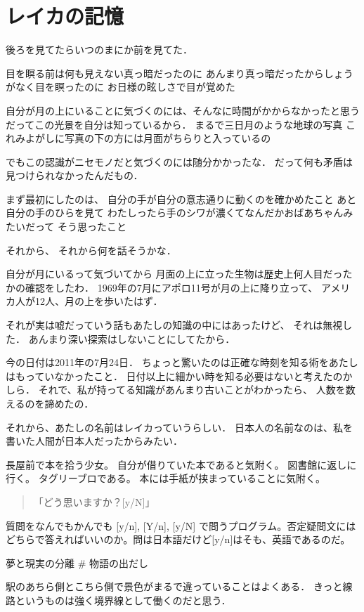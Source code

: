\section{レイカの記憶}

後ろを見てたらいつのまにか前を見てた．

目を瞑る前は何も見えない真っ暗だったのに
あんまり真っ暗だったからしょうがなく目を瞑ったのに
お日様の眩しさで目が覚めた

自分が月の上にいることに気づくのには、そんなに時間がかからなかったと思う
だってこの光景を自分は知っているから． まるで三日月のような地球の写真
これみよがしに写真の下の方には月面がちらりと入っているの

でもこの認識がニセモノだと気づくのには随分かかったな．
だって何も矛盾は見つけられなかったんだもの．

まず最初にしたのは、 自分の手が自分の意志通りに動くのを確かめたこと
あと自分の手のひらを見て
わたしったら手のシワが濃くてなんだかおばあちゃんみたいだって
そう思ったこと

それから、 それから何を話そうかな．

自分が月にいるって気づいてから
月面の上に立った生物は歴史上何人目だったかの確認をしたわ．
1969年の7月にアポロ11号が月の上に降り立って、
アメリカ人が12人、月の上を歩いたはず．

それが実は嘘だっていう話もあたしの知識の中にはあったけど、
それは無視した． あんまり深い探索はしないことにしてたから．

今の日付は2011年の7月24日．
ちょっと驚いたのは正確な時刻を知る術をあたしはもっていなかったこと．
日付以上に細かい時を知る必要はないと考えたのかしら．
それで、私が持ってる知識があんまり古いことがわかったら、
人数を数えるのを諦めたの．

それから、あたしの名前はレイカっていうらしい．
日本人の名前なのは、私を書いた人間が日本人だったからみたい．

長屋前で本を拾う少女。 自分が借りていた本であると気附く。
図書館に返しに行く。 タグリーブロである。
本には手紙が挟まっていることに気附く。

\begin{quote}
「どう思いますか？{[}y/N{]}」
\end{quote}

質問をなんでもかんでも {[}y/n{]}, {[}Y/n{]}, {[}y/N{]}
で問うプログラム。否定疑問文にはどちらで答えればいいのか。問は日本語だけど{[}y/n{]}はそも、英語であるのだ。

夢と現実の分離 \# 物語の出だし

駅のあちら側とこちら側で景色がまるで違っていることはよくある．
きっと線路というものは強く境界線として働くのだと思う．

